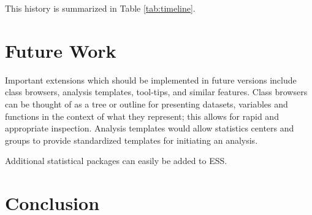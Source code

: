 \documentclass{article}
\newcommand*{\SAS}{\textsc{SAS}}
\begin{document}
This history is summarized in Table \ref{tab:timeline}.


\section{Future Work}



Important extensions which should be implemented in future
versions include class browsers, analysis templates, tool-tips, and
similar features.  Class browsers can be thought of as a tree or
outline for presenting datasets, variables and functions in the
context of what they represent; this allows for rapid and appropriate
inspection.  Analysis templates would allow statistics centers and
groups to provide standardized templates for initiating an analysis.

Additional statistical packages can easily be added to ESS.




\section{Conclusion}
\label{sec:concl}
\end{document}

